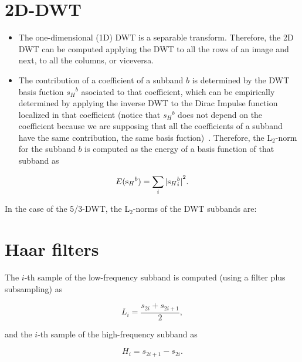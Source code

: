 \section{2D-DWT}    
\begin{itemize}
\tightlist
\item
  The one-dimensional (1D) DWT is a separable transform. Therefore,
  the 2D DWT can be computed applying the DWT to all the rows of an
  image and next, to all the columns, or viceversa.
\end{itemize}


\begin{itemize}
\tightlist
\item
  The contribution of a coefficient of a subband \(b\) is determined
  by the DWT basis fuction \({s_H}^b\) asociated to that coefficient,
  which can be empirically determined by applying the inverse DWT to
  the Dirac Impulse function localized in that coefficient (notice
  that \({s_H}^b\) does not depend on the coefficient because we are
  supposing that all the coefficients of a subband have the same
  contribution, the same basis
  fuction)~\cite{rabbani2009jpeg}. Therefore, the L\(_2\)-norm for the
  subband \(b\) is computed as the energy of a basis function of that
  subband as
\end{itemize}

\begin{equation}
  E({{\text s}_H}^b) = \sum_i{|{{\text s}_H}^b_i|}^2.
\end{equation}

In the case of the 5/3-DWT, the L\(_2\)-norms of the DWT subbands are:

\section{Haar filters~\cite{haar1910theorie}}
The \(i\)-th sample of the low-frequency subband is computed (using a
filter plus subsampling) as

\begin{equation}
  L_i=\frac{s_{2i}+s_{2i+1}}{2},
  \tag{HaarL}
  \label{eq:Haar_A-LPF}
\end{equation}

and the \(i\)-th sample of the high-frequency subband as

\begin{equation}
  H_i=s_{2i+1}-s_{2i}.
  \tag{HaarH}
  \label{eq:Haar_A-HPF}
\end{equation}

